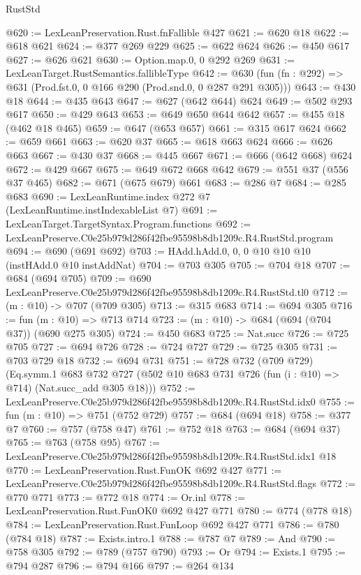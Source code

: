 \begin{lexlean}{RustStd}
\begin{coremodule}
@620 := LexLeanPreservation.Rust.fnFallible @427
@621 := @620 @18
@622 := @618 @621
@624 := @377 @269 @229
@625 := @622 @624
@626 := @450 @617
@627 := @626 @621
@630 := Option.map.{0, 0} @292 @269
@631 := LexLeanTarget.RustSemantics.fallibleType
@642 := @630 (fun (fn : @292) => @631 (Prod.fst.{0, 0} @166 @290 (Prod.snd.{0, 0} @287 @291 @305)))
@643 := @430 @18
@644 := @435 @643
@647 := @627 (@642 @644) @624
@649 := @502 @293 @617
@650 := @429 @643
@653 := @649 @650 @644 @642
@657 := @455 @18 (@462 @18 @465)
@659 := @647 (@653 @657)
@661 := @315 @617 @624
@662 := @659 @661
@663 := @620 @37
@665 := @618 @663 @624
@666 := @626 @663
@667 := @430 @37
@668 := @445 @667
@671 := @666 (@642 @668) @624
@672 := @429 @667
@675 := @649 @672 @668 @642
@679 := @551 @37 (@556 @37 @465)
@682 := @671 (@675 @679) @661
@683 := @286 @7
@684 := @285 @683
@690 := LexLeanRuntime.index @272 @7 (LexLeanRuntime.instIndexableList @7)
@691 := LexLeanTarget.TargetSyntax.Program.functions
@692 := LexLeanPreserve.C0e25b979d286f42fbe95598b8db1209c.R4.RustStd.program
@694 := @690 (@691 @692)
@703 := HAdd.hAdd.{0, 0, 0} @10 @10 @10 (instHAdd.{0} @10 instAddNat)
@704 := @703 @305
@705 := @704 @18
@707 := @684 (@694 @705)
@709 := @690 LexLeanPreserve.C0e25b979d286f42fbe95598b8db1209c.R4.RustStd.tl0
@712 := (m : @10) -> @707 (@709 @305)
@713 := @315 @683
@714 := @694 @305
@716 := fun (m : @10) => @713 @714
@723 := (m : @10) -> @684 (@694 (@704 @37)) (@690 @275 @305)
@724 := @450 @683
@725 := Nat.succ
@726 := @725 @705
@727 := @694 @726
@728 := @724 @727
@729 := @725 @305
@731 := @703 @729 @18
@732 := @694 @731
@751 := @728
    @732
    (@709 @729)
    (Eq.symm.{1}
      @683
      @732
      @727
      (@502 @10 @683 @731 @726 (fun (i : @10) => @714) (Nat.succ_add @305 @18)))
@752 := LexLeanPreserve.C0e25b979d286f42fbe95598b8db1209c.R4.RustStd.idx0
@755 := fun (m : @10) => @751 (@752 @729)
@757 := @684 (@694 @18)
@758 := @377 @7
@760 := @757 (@758 @47)
@761 := @752 @18
@763 := @684 (@694 @37)
@765 := @763 (@758 @95)
@767 := LexLeanPreserve.C0e25b979d286f42fbe95598b8db1209c.R4.RustStd.idx1 @18
@770 := LexLeanPreservation.Rust.FunOK @692 @427
@771 := LexLeanPreserve.C0e25b979d286f42fbe95598b8db1209c.R4.RustStd.flags
@772 := @770 @771
@773 := @772 @18
@774 := Or.inl
@778 := LexLeanPreservation.Rust.FunOK0 @692 @427 @771
@780 := @774 (@778 @18)
@784 := LexLeanPreservation.Rust.FunLoop @692 @427 @771
@786 := @780 (@784 @18)
@787 := Exists.intro.{1}
@788 := @787 @7
@789 := And
@790 := @758 @305
@792 := @789 (@757 @790)
@793 := Or
@794 := Exists.{1}
@795 := @794 @287
@796 := @794 @166
@797 := @264 @134

\end{coremodule}
\end{lexlean}
